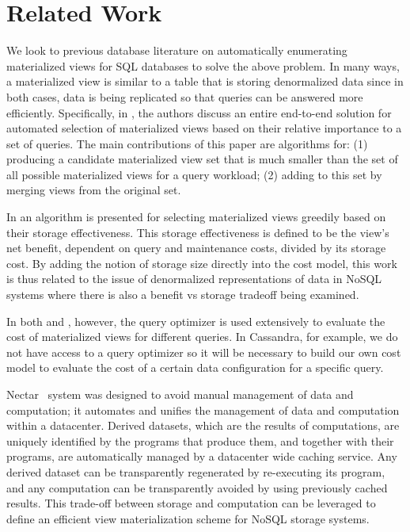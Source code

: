 \documentclass[10pt]{article}
\begin{document}
\section{Related Work}
We look to previous database literature on automatically enumerating materialized views for SQL databases to solve the above problem. 
In many ways, a materialized view is similar to a table that is storing denormalized data since in both cases, data is being replicated so 
that queries can be answered more efficiently. Specifically, in \cite{agrawal2000automated}, the authors discuss an entire end-to-end solution
for automated selection of materialized views based on their relative importance to a set of queries. The main contributions of this paper are 
algorithms for: (1) producing a candidate materialized view set that is much smaller than the set of all possible materialized views for a
query workload; (2) adding to this set by merging views from the original set.

In \cite{chan99design} an algorithm is presented for selecting materialized views greedily based on their storage effectiveness.  This
storage effectiveness is defined to be the view's net benefit, dependent on query and maintenance costs, divided by its storage cost.  By
adding the notion of storage size directly into the cost model, this work is thus related to the issue of denormalized representations of
data in NoSQL systems where there is also a benefit vs storage tradeoff being examined.

In both \cite{agrawal2000automated} and \cite{chan99design}, however, the query optimizer is used extensively to evaluate the cost of materialized views for different queries.
In Cassandra, for example, we do not have access to a query optimizer so it will be necessary to build our own cost model to evaluate the cost
of a certain data configuration for a specific query. 

Nectar~\cite{gunda2010nectar} system was designed to avoid manual management of data and computation; it automates and unifies the management of
data and computation within a datacenter. Derived datasets, which are the results of computations, are uniquely identified by the programs that produce them,
and together with their programs, are automatically managed by a datacenter wide caching service. Any derived dataset can be transparently regenerated by re-executing
its program, and any computation can be transparently avoided by using previously cached results. This trade-off between storage and computation can
be leveraged to define an efficient view materialization scheme for NoSQL storage systems.
\end{document}
